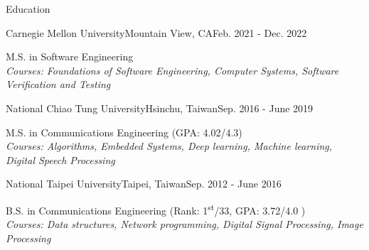 \documentclass{resume_short} %
\newcommand{\ts}{\textsuperscript}
\begin{document}

\begin{rSection}{Education}
    \begin{rSubsection3}{ Carnegie Mellon University}{Mountain View, CA}{Feb. 2021 - Dec. 2022}
        \item {M.S. in Software Engineering} \\
        {\em Courses: Foundations of Software Engineering, Computer Systems, Software Verification and Testing}
    \end{rSubsection3}
    \begin{rSubsection3}{ National Chiao Tung University}{Hsinchu, Taiwan}{Sep. 2016 - June 2019}
        \item {M.S. in Communications Engineering (GPA: 4.02/4.3)} \\
        {\em Courses: Algorithms, Embedded Systems, Deep learning, Machine learning, Digital Speech Processing}
    \end{rSubsection3}
    \begin{rSubsection3}{ National Taipei University}{Taipei, Taiwan}{Sep. 2012 - June 2016}
        \item {B.S. in Communications Engineering (Rank: 1\ts{st}/33, GPA: 3.72/4.0 )} \\
        {\em Courses: Data structures, Network programming, Digital Signal Processing, Image Processing}
    \end{rSubsection3}
\end{rSection}

\end{document}
